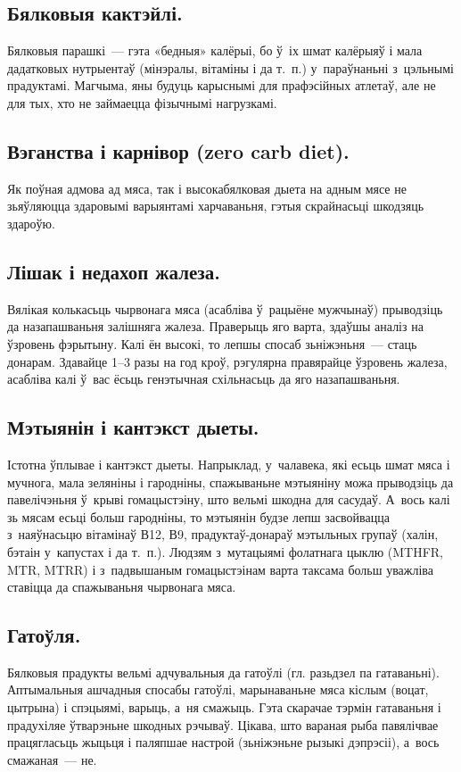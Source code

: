 
\subsection{Бялковыя кактэйлі.}
Бялковыя парашкі~--- гэта «бедныя» калёрыі, бо ў~іх шмат калёрыяў і мала дадатковых нутрыентаў (мінэралы, вітаміны і да т.~п.) у~параўнаньні з~цэльнымі прадуктамі. Магчыма, яны будуць карыснымі для прафэсійных атлетаў, але не для тых, хто не займаецца фізычнымі нагрузкамі.

\subsection{Вэганства і карнівор (zero carb diet).}
Як поўная адмова ад мяса, так і высокабялковая дыета на адным мясе не зьяўляюцца здаровымі варыянтамі харчаваньня, гэтыя скрайнасьці шкодзяць здароўю.

\subsection{Лішак і недахоп жалеза.}
Вялікая колькасьць чырвонага мяса (асабліва ў~рацыёне мужчынаў) прыводзіць да назапашваньня залішняга жалеза. Праверыць яго варта, здаўшы аналіз на ўзровень фэрытыну. Калі ён высокі, то лепшы спосаб зьніжэньня~--- стаць донарам. Здавайце 1--3 разы на год кроў, рэгулярна правярайце ўзровень жалеза, асабліва калі ў~вас ёсьць генэтычная схільнасьць да яго назапашваньня.

\subsection{Мэтыянін і кантэкст дыеты.}
Істотна ўплывае і кантэкст дыеты. Напрыклад, у~чалавека, які есьць шмат мяса і мучнога, мала зеляніны і гародніны, спажываньне мэтыяніну можа прыводзіць да павелічэньня ў~крыві гомацыстэіну, што вельмі шкодна для сасудаў. А~вось калі зь мясам есьці больш гародніны, то мэтыянін будзе лепш засвойвацца з~наяўнасьцю вітамінаў В12, В9, прадуктаў-донараў мэтыльных групаў (халін, бэтаін у~капустах і да т.~п.). Людзям з~мутацыямі фолатнага цыклю (MTHFR, MTR, MTRR) і з~падвышаным гомацыстэінам варта таксама больш уважліва ставіцца да спажываньня чырвонага мяса.

\subsection{Гатоўля.}
Бялковыя прадукты вельмі адчувальныя да гатоўлі (гл. разьдзел па гатаваньні). Аптымальныя ашчадныя спосабы гатоўлі, марынаваньне мяса кіслым (воцат, цытрына) і спэцыямі, варыць, а~ня смажыць. Гэта скарачае тэрмін гатаваньня і прадухіляе ўтварэньне шкодных рэчываў. Цікава, што вараная рыба павялічвае працягласьць жыцьця і паляпшае настрой (зьніжэньне рызыкі дэпрэсіі), а~вось смажаная~--- не.

